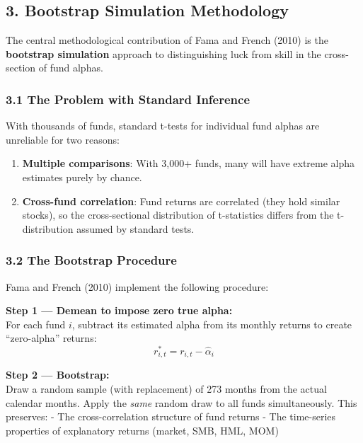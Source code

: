 \documentclass[
  letterpaper,
  DIV=11,
  numbers=noendperiod]{scrartcl}
\providecommand{\tightlist}{%
  \setlength{\itemsep}{0pt}\setlength{\parskip}{0pt}}
\begin{document}
\subsection{3. Bootstrap Simulation
Methodology}\label{bootstrap-simulation-methodology}

The central methodological contribution of Fama and French (2010) is the
\textbf{bootstrap simulation} approach to distinguishing luck from skill
in the cross-section of fund alphas.

\subsubsection{3.1 The Problem with Standard
Inference}\label{the-problem-with-standard-inference}

With thousands of funds, standard t-tests for individual fund alphas are
unreliable for two reasons:

\begin{enumerate}
\def\labelenumi{\arabic{enumi}.}
\tightlist
\item
  \textbf{Multiple comparisons}: With 3,000+ funds, many will have
  extreme alpha estimates purely by chance.
\item
  \textbf{Cross-fund correlation}: Fund returns are correlated (they
  hold similar stocks), so the cross-sectional distribution of
  t-statistics differs from the t-distribution assumed by standard
  tests.
\end{enumerate}

\subsubsection{3.2 The Bootstrap
Procedure}\label{the-bootstrap-procedure}

Fama and French (2010) implement the following procedure:

\textbf{Step 1 --- Demean to impose zero true alpha:}\\
For each fund \(i\), subtract its estimated alpha from its monthly
returns to create ``zero-alpha'' returns:
\[r_{i,t}^* = r_{i,t} - \hat{\alpha}_i\]

\textbf{Step 2 --- Bootstrap:}\\
Draw a random sample (with replacement) of 273 months from the actual
calendar months. Apply the \emph{same} random draw to all funds
simultaneously. This preserves: - The cross-correlation structure of
fund returns - The time-series properties of explanatory returns
(market, SMB, HML, MOM)
\end{document}
